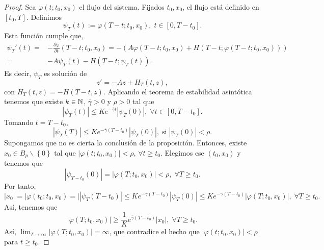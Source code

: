 \begin{proof}
	Sea $\displaystyle \varphi\left(t; t_{0}, x_{0}\right) $ el flujo del sistema. Fijados $\displaystyle t_{0}, x_{0} $, el flujo está definido en $\displaystyle \left[t_{0}, T\right]  $. Definimos 
	\[\psi_{T}\left(t\right):=\varphi\left(T-t; t_{0}, x_{0}\right), \; t \in \left[0, T-t_{0}\right]  .\]
Esta función cumple que, 
\[
\begin{split}
	\psi_{T}'\left(t\right)= &-\frac{\partial \varphi}{\partial t}\left(T-t; t_{0}, x_{0}\right)=-\left(A\varphi\left(T-t; t_{0}, x_{0}\right)+H\left(T-t; \varphi\left(T-t; t_{0}, x_{0}\right)\right)\right) \\
	= & -A\psi_{T}\left(t\right)-H\left(T-t; \psi_{T}\left(t\right)\right).
\end{split}
\]
Es decir, $\displaystyle \psi_{T} $ es solución de 
\[z' = -Az + H_{T}\left(t,z\right) ,\]
con $\displaystyle H_{T}\left(t,z\right)=-H\left(T-t,z\right) $. 
Aplicando el teorema de estabilidad asintótica tenemos que existe $\displaystyle k \in \mathbb{N} $, $\displaystyle \overline{\gamma } > 0 $ y $\displaystyle \rho > 0 $ tal que 
\[ \left|\psi_{T}\left(t\right)\right| \leq Ke^{-\overline{\gamma }t} \left|\psi_{T}\left(0\right)\right|, \; \forall t \in [0,T-t_{0}] .\]
Tomando $\displaystyle t = T-t_{0} $,
\[ \left|\psi_{T}\left(T\right)\right|\leq Ke^{-\overline{\gamma }\left(T-t_{0}\right)} \left|\psi_{T}\left(0\right)\right|, \; \text{si} \; \left|\psi_{T}\left(0\right)\right|<\rho .\]
Supongamos que no es cierta la conclusión de la proposición. Entonces, existe $\displaystyle x_{0}\in B_{p}\backslash \left\{ 0\right\}  $ tal que $\displaystyle \left|\varphi\left(t; t_{0}, x_{0}\right)\right|<\rho $, $\displaystyle \forall t \geq t_{0} $. 
Elegimos ese $\displaystyle \left(t_{0}, x_{0}\right) $ y tenemos que 
\[ \left|\psi_{T-t_{0}}\left(0\right)\right|= \left|\varphi\left(T; t_{0}, x_{0}\right)\right|<\rho, \; \forall T \geq t_{0} .\]
Por tanto, 
\[ \left|x_{0}\right|=\left|\varphi\left(t_{0}; t_{0}, x_{0}\right)=\right|\left|\psi_{T}\left(T-t_{0}\right)\right|\leq Ke^{-\overline{\gamma }\left(T-t_{0}\right)} \left|\psi_{T}\left(0\right)\right|\leq Ke^{-\overline{\gamma }\left(T-t_{0}\right)} \left|\varphi\left(T; t_{0}, x_{0}\right)\right|, \; \forall T \geq t_{0} .\]
Así, tenemos que 
\[ \left|\varphi\left(T; t_{0}, x_{0}\right)\right| \geq \frac{1}{K}e^{\overline{\gamma }\left(T-t_{0}\right)} \left|x_{0}\right|, \; \forall T \geq t_{0} .\]
Así, $\displaystyle \lim_{T \to \infty} \left|\varphi\left(T; t_{0}, x_{0}\right)\right|=\infty  $, que contradice el hecho que $\displaystyle \left|\varphi\left(t; t_{0}, x_{0}\right)\right|< \rho $ para $\displaystyle t \geq t_{0} $. 
\end{proof}
